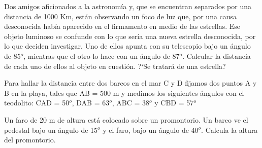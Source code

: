 \vspace{-8mm}
\begin{flushright}
\begin{footnotesize} \textcolor{gris}{}	\end{footnotesize}
\end{flushright}

\begin{mipropuesto}
	
	Dos amigos aficionados a la astronomía y, que se encuentran separados por una distancia de 1000 Km, están observando un foco de luz que, por una causa desconocida había aparecido en el firmamento en medio de las estrellas. Ese objeto luminoso se confunde con lo que sería una nueva estrella desconocida, por lo que deciden investigar. Uno de ellos apunta con su telescopio bajo un ángulo de 85$^o$, mientras que el otro lo hace con un ángulo de 87$^o$. Calcular la distancia de cada uno de ellos al objeto en cuestión. ?`Se tratará de una estrella?
\end{mipropuesto}

\vspace{-8mm}
\begin{flushright}
\begin{footnotesize} \textcolor{gris}{}	\end{footnotesize}
\end{flushright}

\begin{mipropuesto}

Para hallar la distancia entre dos barcos en el mar C y D fijamos dos puntos A y B en la playa, tales que AB = 500 m y medimos los siguientes ángulos con el teodolito: CAD = 50$^o$,           DAB = 63$^o$,           ABC = 38$^o$ y           CBD = 57$^o$
	
\end{mipropuesto}

\vspace{-8mm}
\begin{flushright}
\begin{footnotesize} \textcolor{gris}{}	\end{footnotesize}
\end{flushright}

\begin{mipropuesto}
	
	Un faro de 20 m de altura está colocado sobre un promontorio. Un barco ve el pedestal bajo un ángulo de 15$^o$ y el faro, bajo un ángulo de 40$^o$. Calcula la altura del promontorio.
\end{mipropuesto}

